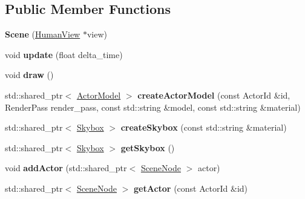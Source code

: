 \subsection*{Public Member Functions}
\begin{DoxyCompactItemize}
\item 
\mbox{\label{classTarbora_1_1Scene_ad0827922d820d7b7e0a83a97d08c3cc3}} 
{\bfseries Scene} (\hyperlink{classTarbora_1_1HumanView}{Human\+View} $\ast$view)
\item 
\mbox{\label{classTarbora_1_1Scene_a88eefc7ab1d64edc2ea99a84588dbdd6}} 
void {\bfseries update} (float delta\+\_\+time)
\item 
\mbox{\label{classTarbora_1_1Scene_a79c20e3cbe4d6c12eac1eddd32cda9f1}} 
void {\bfseries draw} ()
\item 
\mbox{\label{classTarbora_1_1Scene_a1626f74cc58cfca1966d636a3be49796}} 
std\+::shared\+\_\+ptr$<$ \hyperlink{classTarbora_1_1ActorModel}{Actor\+Model} $>$ {\bfseries create\+Actor\+Model} (const Actor\+Id \&id, Render\+Pass render\+\_\+pass, const std\+::string \&model, const std\+::string \&material)
\item 
\mbox{\label{classTarbora_1_1Scene_a79d0e96e0547666cc40350a1a419a7b3}} 
std\+::shared\+\_\+ptr$<$ \hyperlink{classTarbora_1_1Skybox}{Skybox} $>$ {\bfseries create\+Skybox} (const std\+::string \&material)
\item 
\mbox{\label{classTarbora_1_1Scene_adbd6a6424d853aa1d3a7898552216b75}} 
std\+::shared\+\_\+ptr$<$ \hyperlink{classTarbora_1_1Skybox}{Skybox} $>$ {\bfseries get\+Skybox} ()
\item 
\mbox{\label{classTarbora_1_1Scene_a4288785a9f9bee8150daebbb89ab4694}} 
void {\bfseries add\+Actor} (std\+::shared\+\_\+ptr$<$ \hyperlink{classTarbora_1_1SceneNode}{Scene\+Node} $>$ actor)
\item 
\mbox{\label{classTarbora_1_1Scene_a5d76292d0b47e1557550c802b943c1a6}} 
std\+::shared\+\_\+ptr$<$ \hyperlink{classTarbora_1_1SceneNode}{Scene\+Node} $>$ {\bfseries get\+Actor} (const Actor\+Id \&id)

\end{DoxyCompactItemize}
